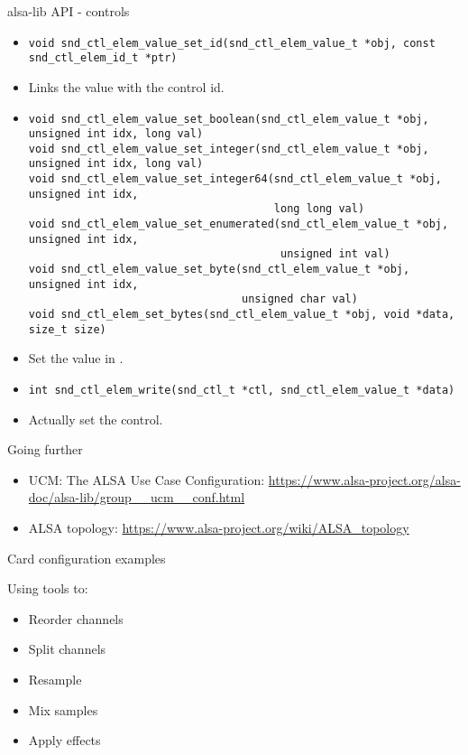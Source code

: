 \begin{frame}[fragile]{alsa-lib API - controls}
  \begin{itemize}
  \item
    \begin{block}{}
    \fontsize{9}{9}\selectfont
      \begin{verbatim}
void snd_ctl_elem_value_set_id(snd_ctl_elem_value_t *obj, const snd_ctl_elem_id_t *ptr)
      \end{verbatim}
    \end{block}
    \item Links the value with the control id.
  \item
    \begin{block}{}
    \fontsize{9}{9}\selectfont
      \begin{verbatim}
void snd_ctl_elem_value_set_boolean(snd_ctl_elem_value_t *obj, unsigned int idx, long val)
void snd_ctl_elem_value_set_integer(snd_ctl_elem_value_t *obj, unsigned int idx, long val)
void snd_ctl_elem_value_set_integer64(snd_ctl_elem_value_t *obj, unsigned int idx,
                                      long long val)
void snd_ctl_elem_value_set_enumerated(snd_ctl_elem_value_t *obj, unsigned int idx,
                                       unsigned int val)
void snd_ctl_elem_value_set_byte(snd_ctl_elem_value_t *obj, unsigned int idx,
                                 unsigned char val)
void snd_ctl_elem_set_bytes(snd_ctl_elem_value_t *obj, void *data, size_t size)
      \end{verbatim}
    \end{block}
  \item Set the value in .
  \item
    \begin{block}{}
    \fontsize{9}{9}\selectfont
      \begin{verbatim}
int snd_ctl_elem_write(snd_ctl_t *ctl, snd_ctl_elem_value_t *data)
      \end{verbatim}
    \end{block}
  \item Actually set the control.
  \end{itemize}
\end{frame}


\begin{frame}{Going further}
  \begin{itemize}
  \item UCM: The ALSA Use Case Configuration:
    \url{https://www.alsa-project.org/alsa-doc/alsa-lib/group__ucm__conf.html}
  \item ALSA topology:
    \url{https://www.alsa-project.org/wiki/ALSA_topology}
  \end{itemize}
\end{frame}

\setupdemoframe
{Card configuration examples}
{
  Using  tools to:
  \begin{itemize}
  \item Reorder channels
  \item Split channels
  \item Resample
  \item Mix samples
  \item Apply effects
  \end{itemize}
}
